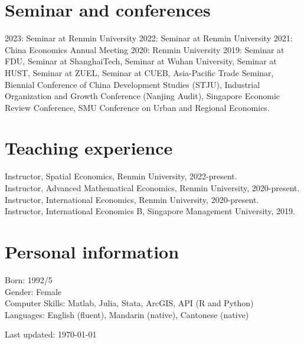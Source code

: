 \documentclass[letterpaper]{article}
\begin{document}
				
				
\section*{\textbf{Seminar and conferences}}
2023: Seminar at  Renmin University 
2022: Seminar at  Renmin University 
2021: China Economics Annual Meeting
2020: Renmin University 
2019: Seminar at  FDU, Seminar at ShanghaiTech, Seminar at  Wuhan University, Seminar at HUST, Seminar at ZUEL, Seminar at  CUEB,  Asia-Pacific Trade Seminar, Biennial Conference of China Development Studies (STJU), Industrial Organization and Growth Conference (Nanjing Audit), Singapore Economic Review Conference,  SMU Conference on Urban and Regional Economics.

		
 \section*{\textbf{Teaching experience}}
Instructor, Spatial Economics, Renmin University, 2022-present.
\\
Instructor, Advanced Mathematical Economics, Renmin University, 2020-present.\\
 Instructor, International Economics, Renmin University, 2020-present.\\
Instructor, International Economics B, Singapore Management University, 2019.


 \section*{\textbf{Personal information}}
 Born: 1992/5\\
 Gender: Female\\
 Computer Skills: Matlab, Julia, Stata, ArcGIS, API (R and Python)\\
 Languages: English (fluent), Mandarin (native), Cantonese (native)
		
	\bigskip
	
	\begin{center}
		\begin{footnotesize}
			Last updated: \today 
		\end{footnotesize}
	\end{center}
	
\end{document}

